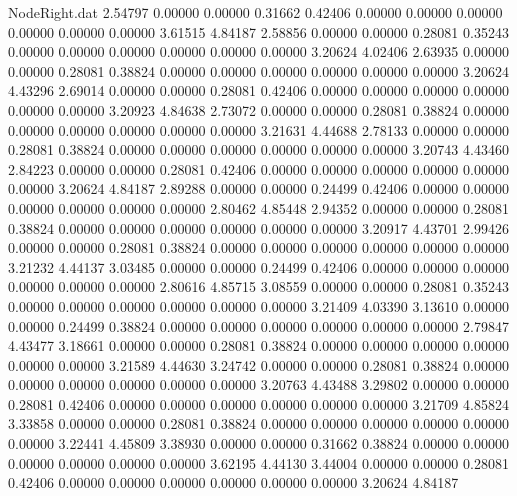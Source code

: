 \begin{filecontents}{NodeRight.dat}
   2.54797    0.00000    0.00000     0.31662    0.42406    0.00000    0.00000    0.00000    0.00000    0.00000    0.00000    3.61515    4.84187
   2.58856    0.00000    0.00000     0.28081    0.35243    0.00000    0.00000    0.00000    0.00000    0.00000    0.00000    3.20624    4.02406
   2.63935    0.00000    0.00000     0.28081    0.38824    0.00000    0.00000    0.00000    0.00000    0.00000    0.00000    3.20624    4.43296
   2.69014    0.00000    0.00000     0.28081    0.42406    0.00000    0.00000    0.00000    0.00000    0.00000    0.00000    3.20923    4.84638
   2.73072    0.00000    0.00000     0.28081    0.38824    0.00000    0.00000    0.00000    0.00000    0.00000    0.00000    3.21631    4.44688
   2.78133    0.00000    0.00000     0.28081    0.38824    0.00000    0.00000    0.00000    0.00000    0.00000    0.00000    3.20743    4.43460
   2.84223    0.00000    0.00000     0.28081    0.42406    0.00000    0.00000    0.00000    0.00000    0.00000    0.00000    3.20624    4.84187
   2.89288    0.00000    0.00000     0.24499    0.42406    0.00000    0.00000    0.00000    0.00000    0.00000    0.00000    2.80462    4.85448
   2.94352    0.00000    0.00000     0.28081    0.38824    0.00000    0.00000    0.00000    0.00000    0.00000    0.00000    3.20917    4.43701
   2.99426    0.00000    0.00000     0.28081    0.38824    0.00000    0.00000    0.00000    0.00000    0.00000    0.00000    3.21232    4.44137
   3.03485    0.00000    0.00000     0.24499    0.42406    0.00000    0.00000    0.00000    0.00000    0.00000    0.00000    2.80616    4.85715
   3.08559    0.00000    0.00000     0.28081    0.35243    0.00000    0.00000    0.00000    0.00000    0.00000    0.00000    3.21409    4.03390
   3.13610    0.00000    0.00000     0.24499    0.38824    0.00000    0.00000    0.00000    0.00000    0.00000    0.00000    2.79847    4.43477
   3.18661    0.00000    0.00000     0.28081    0.38824    0.00000    0.00000    0.00000    0.00000    0.00000    0.00000    3.21589    4.44630
   3.24742    0.00000    0.00000     0.28081    0.38824    0.00000    0.00000    0.00000    0.00000    0.00000    0.00000    3.20763    4.43488
   3.29802    0.00000    0.00000     0.28081    0.42406    0.00000    0.00000    0.00000    0.00000    0.00000    0.00000    3.21709    4.85824
   3.33858    0.00000    0.00000     0.28081    0.38824    0.00000    0.00000    0.00000    0.00000    0.00000    0.00000    3.22441    4.45809
   3.38930    0.00000    0.00000     0.31662    0.38824    0.00000    0.00000    0.00000    0.00000    0.00000    0.00000    3.62195    4.44130
   3.44004    0.00000    0.00000     0.28081    0.42406    0.00000    0.00000    0.00000    0.00000    0.00000    0.00000    3.20624    4.84187

\end{filecontents}
